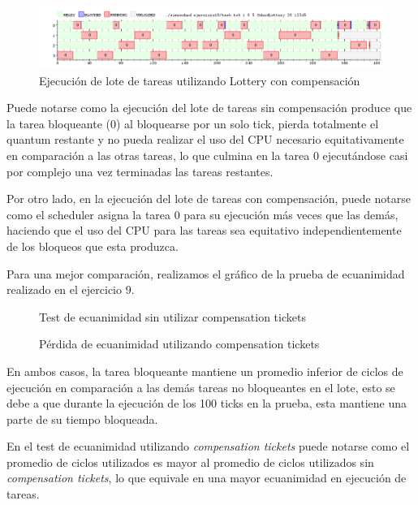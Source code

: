 \documentclass[a4paper,10pt,twoside]{article}
\begin{document}
\begin{figure}[H]
\centering
\includegraphics[width=175mm]{../ejercicio10/GraphSchedLot.png}
\caption{Ejecución de lote de tareas utilizando Lottery con compensación}
\label{GraphSchedLot}
\end{figure}

Puede notarse como la ejecución del lote de tareas sin compensación produce que la tarea bloqueante (0) al bloquearse por un solo tick, pierda totalmente el quantum restante y no pueda realizar el uso del CPU necesario equitativamente en comparación a las otras tareas, lo que culmina en la tarea 0 ejecutándose casi por complejo una vez terminadas las tareas restantes.

Por otro lado, en la ejecución del lote de tareas con compensación, puede notarse como el scheduler asigna la tarea 0 para su ejecución más veces que las demás, haciendo que el uso del CPU para las tareas sea equitativo independientemente de los bloqueos que esta produzca.

Para una mejor comparación, realizamos el gráfico de la prueba de ecuanimidad realizado en el ejercicio 9.

\begin{figure}[H]
	\centering
	
	\caption{Test de ecuanimidad sin utilizar compensation tickets}
\end{figure}

\begin{figure}[H]
	\centering
	
	\caption{Pérdida de ecuanimidad utilizando compensation tickets}
\end{figure}

En ambos casos, la tarea bloqueante mantiene un promedio inferior de ciclos de ejecución en comparación a las demás tareas no bloqueantes en el lote, esto se debe a que durante la ejecución de los 100 ticks en la prueba, esta mantiene una parte de su tiempo bloqueada.

En el test de ecuanimidad utilizando \textit{compensation tickets} puede notarse como el promedio de ciclos utilizados es mayor al promedio de ciclos utilizados sin \textit{compensation tickets}, lo que equivale en una mayor ecuanimidad en ejecución de tareas.
\end{document}
